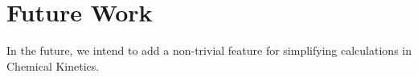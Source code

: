 \chapter{Future Work}
In the future, we intend to add a non-trivial feature for simplifying calculations in Chemical Kinetics. 
